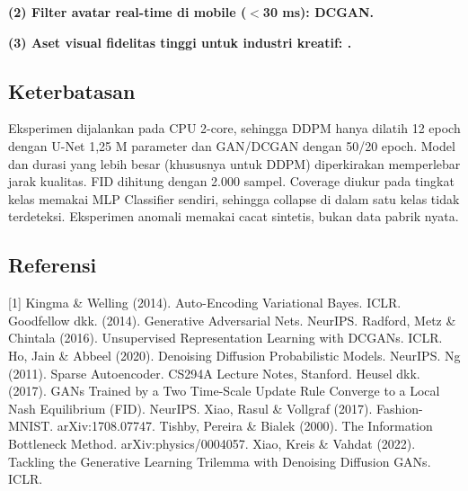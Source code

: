 \textbf{(2) Filter avatar real-time di mobile ($<$30 ms): DCGAN.} \AvatarText

\textbf{(3) Aset visual fidelitas tinggi untuk industri kreatif: \CreativeChoice.} \CreativeText

\subsection*{Keterbatasan}
Eksperimen dijalankan pada CPU 2-core, sehingga DDPM hanya dilatih 12 epoch dengan U-Net 1,25 M parameter dan GAN/DCGAN
dengan 50/20 epoch. Model dan durasi yang lebih besar (khususnya untuk DDPM) diperkirakan memperlebar jarak kualitas. FID dihitung
dengan 2.000 sampel. Coverage diukur pada tingkat kelas memakai MLP Classifier sendiri, sehingga collapse di dalam satu kelas tidak
terdeteksi. Eksperimen anomali memakai cacat sintetis, bukan data pabrik nyata.

\subsection*{Referensi}
{\small
[1] Kingma \& Welling (2014). Auto-Encoding Variational Bayes. ICLR. \;
[2] Goodfellow dkk. (2014). Generative Adversarial Nets. NeurIPS. \;
[3] Radford, Metz \& Chintala (2016). Unsupervised Representation Learning with DCGANs. ICLR. \;
[4] Ho, Jain \& Abbeel (2020). Denoising Diffusion Probabilistic Models. NeurIPS. \;
[5] Ng (2011). Sparse Autoencoder. CS294A Lecture Notes, Stanford. \;
[6] Heusel dkk. (2017). GANs Trained by a Two Time-Scale Update Rule Converge to a Local Nash Equilibrium (FID). NeurIPS. \;
[7] Xiao, Rasul \& Vollgraf (2017). Fashion-MNIST. arXiv:1708.07747. \;
[8] Tishby, Pereira \& Bialek (2000). The Information Bottleneck Method. arXiv:physics/0004057. \;
[9] Xiao, Kreis \& Vahdat (2022). Tackling the Generative Learning Trilemma with Denoising Diffusion GANs. ICLR.}
